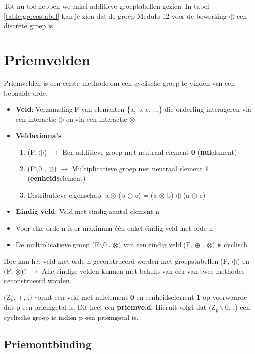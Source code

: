 \documentclass[12pt]{report}
\newcommand{\todo}[1] {
\color{red}\textunderscore{\textit{TODO: #1}}
\color{black}
}
\newcommand{\important}[1] {\textbf{\color{orange}#1}}
\begin{document}
Tot nu toe hebben we enkel additieve groeptabellen gezien. In tabel \ref{table:groepstabel} kan je zien dat de groep Modulo 12 
voor de bewerking $\oplus$ een discrete groep is


\section{Priemvelden}
Priemvelden is een eerste methode om een cyclische groep te vinden van een bepaalde orde.
\begin{itemize}
	\item \important{Veld}: Verzameling F van elementen \{a, b, c, ...\} die onderling interageren via een interactie $\oplus$ en via 
	      een interactie $\otimes$.
	      	      
	\item \important{Veldaxioma's}
	      \begin{enumerate}
	      	\item (F, $\oplus$) $\rightarrow$ Een additieve groep met neutraal element \important{0} (\important{nul}element)
	      	\item (F$\backslash$0 , $\otimes$) $\rightarrow$ Multiplicatieve groep met neutraal element \important{1} 
	      	      (\important{eenheids}element)
	      	\item Distributieve eigenschap: a $\otimes$ (b $\oplus$ c) = (a $\otimes$ b) $\oplus$ (a $\otimes$ c)
	      \end{enumerate}
	\item \important{Eindig veld}: Veld met eindig aantal element n
	\item Voor elke orde n is er maximum één enkel eindig veld met orde n
	\item De multiplicatieve groep (F$\backslash$0 , $\otimes$) van een eindig veld (F, $\oplus$ , $\otimes$) is cyclisch
\end{itemize}
Hoe kan het veld met orde n geconstrueerd worden met groepstabellen (F, $\oplus$) en (F, $\otimes$)? $\rightarrow$ Alle eindige velden
kunnen met behulp van één van twee methodes geconstrueerd worden.

(Z$_p$, +, .) vormt een veld met nulelement \important{0} en eenheidselement \important{1} op voorwaarde dat p een priemgetal is. Dit heet een
\important{priemveld}. Hieruit volgt dat (Z$_p\backslash$0, .) een cyclische groep is indien p een priemgetal is.


\subsection{Priemontbinding}
\todo{todo}
\end{document}
